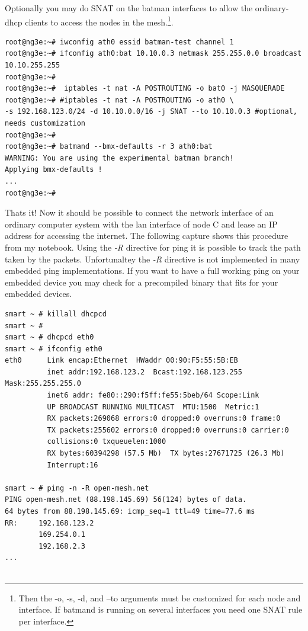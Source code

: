 \documentclass[11pt]{article}
\begin{document}
\begin{enumerate}
Optionally you may do SNAT on the batman interfaces to allow the ordinary-dhcp clients to access the nodes in the mesh.\footnote{Then the -o, -s, -d, and --to arguments must be customized for each node and interface. If batmand is running on several interfaces you need one SNAT rule per interface.}.

\begin{small} \begin{verbatim}
root@ng3e:~# iwconfig ath0 essid batman-test channel 1
root@ng3e:~# ifconfig ath0:bat 10.10.0.3 netmask 255.255.0.0 broadcast 10.10.255.255
root@ng3e:~# 
root@ng3e:~#  iptables -t nat -A POSTROUTING -o bat0 -j MASQUERADE
root@ng3e:~# #iptables -t nat -A POSTROUTING -o ath0 \
-s 192.168.123.0/24 -d 10.10.0.0/16 -j SNAT --to 10.10.0.3 #optional, needs customization
root@ng3e:~# 
root@ng3e:~# batmand --bmx-defaults -r 3 ath0:bat
WARNING: You are using the experimental batman branch!
Applying bmx-defaults !
...
root@ng3e:~# 

\end{verbatim} \end{small}

Thats it! Now it should be possible to connect the network interface of an ordinary computer system with the lan interface of node C and lease an IP address for accessing the internet. The following capture shows this procedure from my notebook. Using the \emph{-R} directive for ping it is possible to track the path taken by the packets.
Unfortunaltey the \emph{-R} directive is not implemented in many embedded ping implementations. If you want to have a full working ping on your embedded device you may check \cite{useful-net-tools} for a precompiled binary that fits for your embedded devices.

\begin{small} \begin{verbatim}
smart ~ # killall dhcpcd
smart ~ #
smart ~ # dhcpcd eth0
smart ~ # ifconfig eth0
eth0      Link encap:Ethernet  HWaddr 00:90:F5:55:5B:EB
          inet addr:192.168.123.2  Bcast:192.168.123.255  Mask:255.255.255.0
          inet6 addr: fe80::290:f5ff:fe55:5beb/64 Scope:Link
          UP BROADCAST RUNNING MULTICAST  MTU:1500  Metric:1
          RX packets:269068 errors:0 dropped:0 overruns:0 frame:0
          TX packets:255602 errors:0 dropped:0 overruns:0 carrier:0
          collisions:0 txqueuelen:1000
          RX bytes:60394298 (57.5 Mb)  TX bytes:27671725 (26.3 Mb)
          Interrupt:16

smart ~ # ping -n -R open-mesh.net
PING open-mesh.net (88.198.145.69) 56(124) bytes of data.
64 bytes from 88.198.145.69: icmp_seq=1 ttl=49 time=77.6 ms
RR:     192.168.123.2
        169.254.0.1
        192.168.2.3
...


\end{verbatim}
\end{small}
\end{enumerate}
\end{document}
